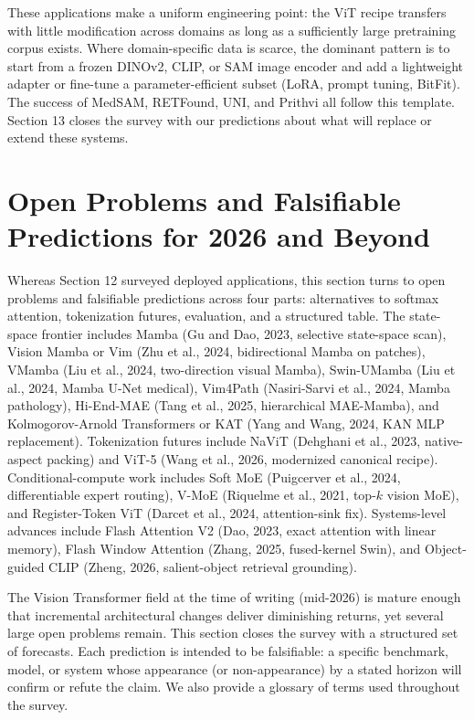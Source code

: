 \documentclass{article}
\begin{document}
These applications make a uniform engineering point: the ViT recipe transfers with little modification across domains as long as a sufficiently large pretraining corpus exists. Where domain-specific data is scarce, the dominant pattern is to start from a frozen DINOv2, CLIP, or SAM image encoder and add a lightweight adapter or fine-tune a parameter-efficient subset (LoRA, prompt tuning, BitFit). The success of MedSAM, RETFound, UNI, and Prithvi all follow this template. Section 13 closes the survey with our predictions about what will replace or extend these systems.

\section{Open Problems and Falsifiable Predictions for 2026 and Beyond}\label{open-problems-and-falsifiable-predictions-for-2026-and-beyond}

Whereas Section 12 surveyed deployed applications, this section turns to open problems and falsifiable predictions across four parts: alternatives to softmax attention, tokenization futures, evaluation, and a structured table. The state-space frontier includes Mamba (Gu and Dao, 2023, selective state-space scan), Vision Mamba or Vim (Zhu et al., 2024, bidirectional Mamba on patches), VMamba (Liu et al., 2024, two-direction visual Mamba), Swin-UMamba (Liu et al., 2024, Mamba U-Net medical), Vim4Path (Nasiri-Sarvi et al., 2024, Mamba pathology), Hi-End-MAE (Tang et al., 2025, hierarchical MAE-Mamba), and Kolmogorov-Arnold Transformers or KAT (Yang and Wang, 2024, KAN MLP replacement). Tokenization futures include NaViT (Dehghani et al., 2023, native-aspect packing) and ViT-5 (Wang et al., 2026, modernized canonical recipe). Conditional-compute work includes Soft MoE (Puigcerver et al., 2024, differentiable expert routing), V-MoE (Riquelme et al., 2021, top-\(k\) vision MoE), and Register-Token ViT (Darcet et al., 2024, attention-sink fix). Systems-level advances include Flash Attention V2 (Dao, 2023, exact attention with linear memory), Flash Window Attention (Zhang, 2025, fused-kernel Swin), and Object-guided CLIP (Zheng, 2026, salient-object retrieval grounding).

The Vision Transformer field at the time of writing (mid-2026) is mature enough that incremental architectural changes deliver diminishing returns, yet several large open problems remain. This section closes the survey with a structured set of forecasts. Each prediction is intended to be falsifiable: a specific benchmark, model, or system whose appearance (or non-appearance) by a stated horizon will confirm or refute the claim. We also provide a glossary of terms used throughout the survey.
\end{document}
